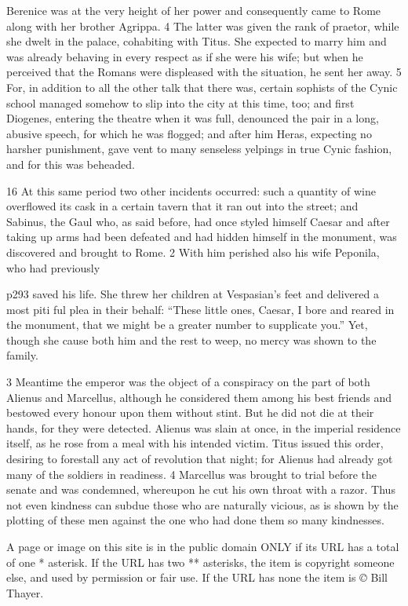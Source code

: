 Berenice was at the very height of her power and consequently came to Rome along with her brother Agrippa. 4 The latter was given the rank of praetor, while she dwelt in the palace, cohabiting with Titus. She expected to marry him and was already behaving in every respect as if she were his wife; but when he perceived that the Romans were displeased with the situation, he sent her away. 5 For, in addition to all the other talk that there was, certain sophists of the Cynic school managed somehow to slip into the city at this time, too; and first Diogenes, entering the theatre when it was full, denounced the pair in a long, abusive speech, for which he was flogged; and after him Heras, expecting no harsher punishment, gave vent to many senseless yelpings in true Cynic fashion, and for this was beheaded.

16
At this same period two other incidents occurred: such a quantity of wine overflowed its cask in a certain tavern that it ran out into the street; and Sabinus, the Gaul who, as said before, had once styled himself Caesar and after taking up arms had been defeated and had hidden himself in the monument, was discovered and brought to Rome. 2 With him perished also his wife Peponila, who had previously

p293 saved his life. She threw her children at Vespasian's feet and delivered a most piti ­ful plea in their behalf: ``These little ones, Caesar, I bore and reared in the monument, that we might be a greater number to supplicate you.'' Yet, though she cause both him and the rest to weep, no mercy was shown to the family.

3
Meantime the emperor was the object of a conspiracy on the part of both Alienus and Marcellus, although he considered them among his best friends and bestowed every honour upon them without stint. But he did not die at their hands, for they were detected. Alienus was slain at once, in the imperial residence itself, as he rose from a meal with his intended victim. Titus issued this order, desiring to forestall any act of revolution that night; for Alienus had already got many of the soldiers in readiness. 4 Marcellus was brought to trial before the senate and was condemned, whereupon he cut his own throat with a razor. Thus not even kindness can subdue those who are naturally vicious, as is shown by the plotting of these men against the one who had done them so many kindnesses.

A page or image on this site is in the public domain ONLY if its URL has a total of one * asterisk. If the URL has two ** asterisks, the item is copyright someone else, and used by permission or fair use. If the URL has none the item is \emph{©} Bill Thayer.

